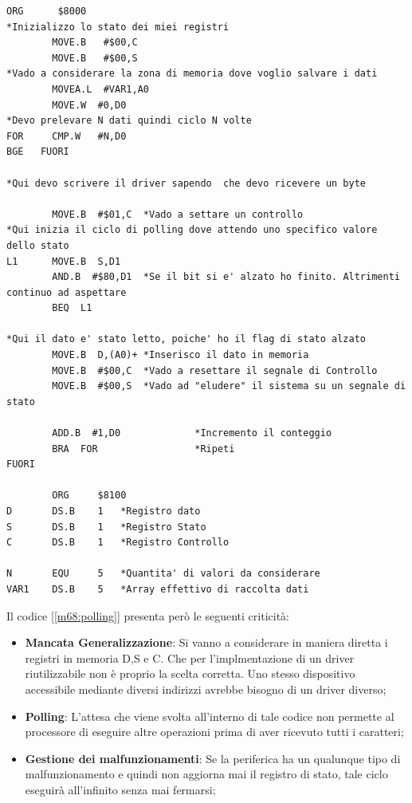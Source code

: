 \begin{lstlisting}[caption={Codice polling}, label=m68:polling]
        ORG      $8000
*Inizializzo lo stato dei miei registri
        MOVE.B   #$00,C
        MOVE.B   #$00,S
*Vado a considerare la zona di memoria dove voglio salvare i dati
        MOVEA.L  #VAR1,A0
        MOVE.W  #0,D0
*Devo prelevare N dati quindi ciclo N volte
FOR     CMP.W   #N,D0
BGE   FUORI

*Qui devo scrivere il driver sapendo  che devo ricevere un byte

        MOVE.B  #$01,C  *Vado a settare un controllo
*Qui inizia il ciclo di polling dove attendo uno specifico valore dello stato
L1      MOVE.B  S,D1
        AND.B  #$80,D1  *Se il bit si e' alzato ho finito. Altrimenti continuo ad aspettare
        BEQ  L1

*Qui il dato e' stato letto, poiche' ho il flag di stato alzato
        MOVE.B  D,(A0)+ *Inserisco il dato in memoria
        MOVE.B  #$00,C  *Vado a resettare il segnale di Controllo
        MOVE.B  #$00,S  *Vado ad "eludere" il sistema su un segnale di stato

        ADD.B  #1,D0             *Incremento il conteggio
        BRA  FOR                 *Ripeti
FUORI

        ORG     $8100
D       DS.B    1   *Registro dato
S       DS.B    1   *Registro Stato
C       DS.B    1   *Registro Controllo

N       EQU     5   *Quantita' di valori da considerare
VAR1    DS.B    5   *Array effettivo di raccolta dati
\end{lstlisting}
\newpage
Il codice [\ref{m68:polling}] presenta però le seguenti criticità:
\begin{itemize}
    \item \textbf{Mancata Generalizzazione}: Si vanno a considerare in maniera diretta i registri in memoria D,S e C. Che per l'implmentazione di un driver riutilizzabile non è proprio la scelta corretta. Uno stesso dispositivo accessibile mediante diversi indirizzi avrebbe bisogno di un driver diverso;
    \item \textbf{Polling}: L'attesa che viene svolta all'interno di tale codice non permette al processore di eseguire altre operazioni prima di aver ricevuto tutti i caratteri;
    \item \textbf{Gestione dei malfunzionamenti}: Se la periferica ha un qualunque tipo di malfunzionamento e quindi non aggiorna mai il registro di stato, tale ciclo eseguirà all'infinito senza mai fermarsi;
\end{itemize}

